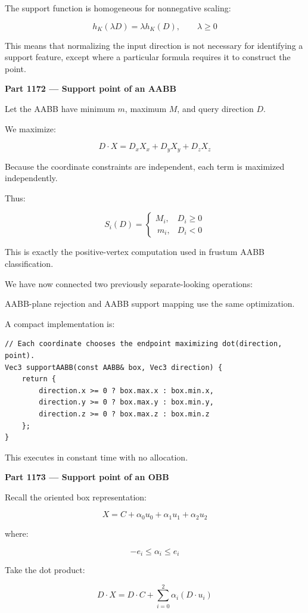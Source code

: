 The support function is homogeneous for nonnegative scaling:

\[
h_K(\lambda D)=\lambda h_K(D),\qquad\lambda\ge0
\]

This means that normalizing the input direction is not necessary for identifying a support feature, except where a particular formula requires it to construct the point.

\textbf{Part 1172 --- Support point of an AABB}

Let the AABB have minimum \(m\), maximum \(M\), and query direction \(D\).

We maximize:

\[
D\cdot X=D_xX_x+D_yX_y+D_zX_z
\]

Because the coordinate constraints are independent, each term is maximized independently.

Thus:

\[
\boxed{ S_i(D)= \begin{cases} M_i,&D_i\ge0\\\ m_i,&D_i<0 \end{cases} }
\]

This is exactly the positive-vertex computation used in frustum AABB classification.

We have now connected two previously separate-looking operations:

AABB-plane rejection and AABB support mapping use the same optimization.

A compact implementation is:

\begin{verbatim}
// Each coordinate chooses the endpoint maximizing dot(direction, point).
Vec3 supportAABB(const AABB& box, Vec3 direction) {
    return {
        direction.x >= 0 ? box.max.x : box.min.x,
        direction.y >= 0 ? box.max.y : box.min.y,
        direction.z >= 0 ? box.max.z : box.min.z
    };
}
\end{verbatim}

This executes in constant time with no allocation.

\textbf{Part 1173 --- Support point of an OBB}

Recall the oriented box representation:

\[
X=C+\alpha_0u_0+\alpha_1u_1+\alpha_2u_2
\]

where:

\[
-e_i\le\alpha_i\le e_i
\]

Take the dot product:

\[
D\cdot X= D\cdot C+ \sum_{i=0}^2\alpha_i(D\cdot u_i)
\]

